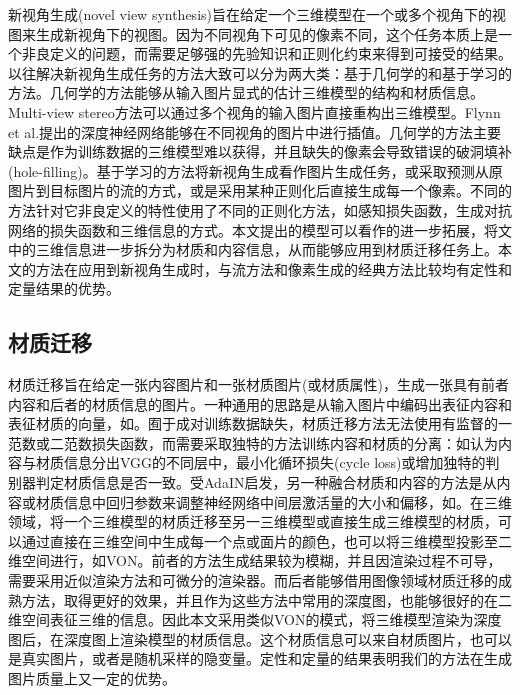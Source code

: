 \documentclass[UTF8,openany,AutoFakeBold,AutoFakeSlant,cs4size]{ctexbook}
\begin{document}
新视角生成(novel view synthesis)旨在给定一个三维模型在一个或多个视角下的视图来生成新视角下的视图。因为不同视角下可见的像素不同，这个任务本质上是一个非良定义的问题，而需要足够强的先验知识和正则化约束来得到可接受的结果。以往解决新视角生成任务的方法大致可以分为两大类：基于几何学的和基于学习的方法。几何学的方法能够从输入图片显式的估计三维模型的结构和材质信息。Multi-view stereo\cite{Furukawa:2015:MST:2864699.2864700}方法可以通过多个视角的输入图片直接重构出三维模型。Flynn et al.\cite{7780964}提出的深度神经网络能够在不同视角的图片中进行插值。几何学的方法主要缺点是作为训练数据的三维模型难以获得，并且缺失的像素会导致错误的破洞填补(hole-filling)。基于学习的方法将新视角生成看作图片生成任务，或采取预测从原图片到目标图片的流\cite{Zhou2016ViewSB, sun2018multiview, olszewski2019tbn}的方式，或是采用某种正则化后直接生成每一个像素\cite{TDB16a, Huang_2017_ICCV, VIGAN, Park2017TransformationGroundedIG}。不同的方法针对它非良定义的特性使用了不同的正则化方法，如感知损失函数\cite{olszewski2019tbn}，生成对抗网络的损失函数\cite{Huang_2017_ICCV}和三维信息\cite{VIGAN}的方式。本文提出的模型可以看作\cite{VIGAN}的进一步拓展，将文中的三维信息进一步拆分为材质和内容信息，从而能够应用到材质迁移任务上。本文的方法在应用到新视角生成时，与流方法和像素生成的经典方法比较均有定性和定量结果的优势。

\subsection{材质迁移}

材质迁移旨在给定一张内容图片和一张材质图片(或材质属性)，生成一张具有前者内容和后者的材质信息的图片。一种通用的思路是从输入图片中编码出表征内容和表征材质的向量，如\cite{zheng2019joint, BeautyGlow, Li2018BeautyGANIF, Wu2019DisentanglingCA}。囿于成对训练数据缺失，材质迁移方法无法使用有监督的一范数或二范数损失函数，而需要采取独特的方法训练内容和材质的分离：如认为内容与材质信息分出VGG的不同层中\cite{7780634}，最小化循环损失(cycle loss)\cite{Lu2017ConditionalCF}或增加独特的判别器判定材质信息是否一致\cite{pix2pixSC2019, ma2017pose}。受AdaIN\cite{huang2017adain}启发，另一种融合材质和内容的方法是从内容或材质信息中回归参数来调整神经网络中间层激活量的大小和偏移，如\cite{zhu2019sean, park2019SPADE}。在三维领域，将一个三维模型的材质迁移至另一三维模型或直接生成三维模型的材质，可以通过直接在三维空间中生成每一个点或面片的颜色\cite{cmrKanazawa18}，也可以将三维模型投影至二维空间进行，如VON\cite{VON}。前者的方法生成结果较为模糊，并且因渲染过程不可导，需要采用近似渲染方法和可微分的渲染器\cite{Kato_2018_CVPR}。而后者能够借用图像领域材质迁移的成熟方法，取得更好的效果，并且作为这些方法中常用的深度图，也能够很好的在二维空间表征三维的信息。因此本文采用类似VON的模式，将三维模型渲染为深度图后，在深度图上渲染模型的材质信息。这个材质信息可以来自材质图片，也可以是真实图片，或者是随机采样的隐变量。定性和定量的结果表明我们的方法在生成图片质量上又一定的优势。
\end{document}
